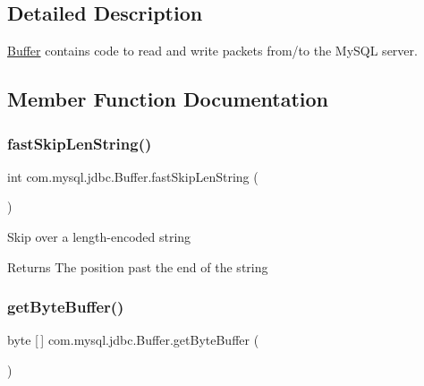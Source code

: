 \subsection{Detailed Description}
\mbox{\hyperlink{classcom_1_1mysql_1_1jdbc_1_1_buffer}{Buffer}} contains code to read and write packets from/to the My\+S\+QL server. 

\subsection{Member Function Documentation}
\mbox{\label{classcom_1_1mysql_1_1jdbc_1_1_buffer_a28c84074ea3c21866a0cb59bfa1edcb3}} 
\subsubsection{\texorpdfstring{fast\+Skip\+Len\+String()}{fastSkipLenString()}}
{\footnotesize\ttfamily int com.\+mysql.\+jdbc.\+Buffer.\+fast\+Skip\+Len\+String (\begin{DoxyParamCaption}{ }\end{DoxyParamCaption})}

Skip over a length-\/encoded string

\begin{DoxyReturn}{Returns}
The position past the end of the string 
\end{DoxyReturn}
\mbox{\label{classcom_1_1mysql_1_1jdbc_1_1_buffer_ae784a6295702aa89204d8d5023e61761}} 
\subsubsection{\texorpdfstring{get\+Byte\+Buffer()}{getByteBuffer()}}
{\footnotesize\ttfamily byte \mbox{[}$\,$\mbox{]} com.\+mysql.\+jdbc.\+Buffer.\+get\+Byte\+Buffer (\begin{DoxyParamCaption}{ }\end{DoxyParamCaption})}

